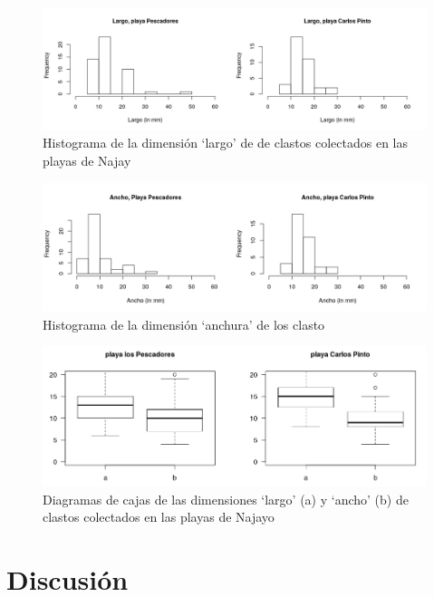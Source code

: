 \documentclass[11pt,]{article}
\begin{document}
\begin{figure}
\centering
\includegraphics{largo_hist.png}
\caption{Histograma de la dimensión `largo' de de clastos colectados en
las playas de Najay\label{largo}}
\end{figure}

\begin{figure}
\centering
\includegraphics{ancho_hist.png}
\caption{Histograma de la dimensión `anchura' de los
clasto\label{ancho}}
\end{figure}

\begin{figure}
\centering
\includegraphics{diagrama.png}
\caption{Diagramas de cajas de las dimensiones `largo' (a) y `ancho' (b)
de clastos colectados en las playas de Najayo\label{playa}}
\end{figure}

\section{Discusión}\label{discusiuxf3n}
\end{document}
